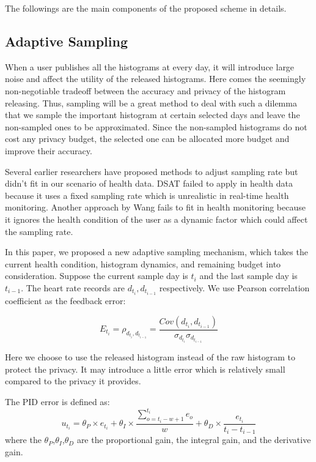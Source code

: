 \documentclass[10pt,conference]{IEEEtran}
\begin{document}
The followings are the main components of the proposed scheme in details.

\subsection{Adaptive Sampling}
When a user publishes all the histograms at every day, it will introduce large noise and affect the utility of the released histograms. Here comes the seemingly non-negotiable tradeoff between the accuracy and privacy of the histogram releasing. Thus, sampling will be a great method to deal with such a dilemma that we sample the important histogram at certain selected days and leave the non-sampled ones to be approximated. Since the non-sampled histograms do not cost any privacy budget, the selected one can be allocated more budget and improve their accuracy.

Several earlier researchers have proposed methods to adjust sampling rate but didn't fit in our scenario of health data. DSAT\cite{Li2015Differentially} failed to apply in health data because it uses a fixed sampling rate which is unrealistic in real-time health monitoring. Another approach by Wang \cite{Wang2016RescueDP} fails to fit in health monitoring because it ignores the health condition of the user as a dynamic factor which could affect the sampling rate.

In this paper, we proposed a new adaptive sampling mechanism, which takes the current health condition, histogram dynamics, and remaining budget into consideration. Suppose the current sample day is $t_i$ and the last sample day is $t_{i-1}$. The heart rate records are $d_{t_i},d_{t_{i-1}}$ respectively. We use Pearson correlation coefficient as the feedback error:

\begin{equation}\label{Pearson}
E_{t_i}=\rho_{d_{t_i},d_{t_{i-1}}}=\frac{Cov(d_{t_i},d_{t_{i-1}})}{\sigma_{d_{t_i}}\sigma_{d_{t_{i-1}}}}
\end{equation}

Here we choose to use the released histogram instead of the raw histogram to protect the privacy. It may introduce a little error which is relatively small compared to the privacy it provides.

The PID error is defined as:
\begin{equation}\label{PIDerror}
u_{t_i}=\theta_P\times e_{t_i}+\theta_I\times \frac{\sum_{o=t_i-w+1}^{t_i}e_{o}}{w}+\theta_D\times \frac{e_{t_i}}{t_i-t_{i-1}}
\end{equation}
where the $\theta_P$,$\theta_I$,$\theta_D$  are the proportional gain, the integral gain, and the derivative gain.
\end{document}
